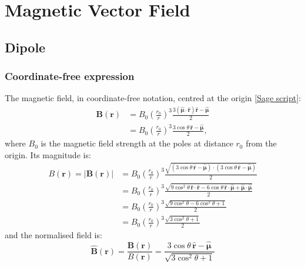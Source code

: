 \documentclass{book}
\newcommand{\unitvec}[1]{\hat{\pmb{#1}}}
\newcommand{\linktosage}[1]{\hyperref[#1]{[Sage script]}}
\begin{document}
\section{Magnetic Vector Field}

\subsection{Dipole}

\subsubsection{Coordinate-free expression}

The magnetic field, in coordinate-free notation, centred at the origin \linktosage{sage:Bdip}:
\begin{equation}
    \begin{aligned}
        \pmb{B}(\pmb{r})
            &= B_0\left(\frac{r_0}{r}\right)^3\frac{3(\unitvec{\mu}\cdot\unitvec{r})\unitvec{r} - \unitvec{\mu}}{2} \\
            &= B_0\left(\frac{r_0}{r}\right)^3\frac{3\cos\theta\,\unitvec{r} - \unitvec{\mu}}{2},
    \end{aligned}
\end{equation}
where $B_0$ is the magnetic field strength at the poles at distance $r_0$ from the origin.
Its magnitude is:
\begin{equation}
\begin{aligned}
    B({\pmb{r}}) = |\pmb{B}(\pmb{r})|
        &= B_0\left(\frac{r_0}{r}\right)^3 \frac{\sqrt{(3\cos\theta\,\unitvec{r} - \unitvec{\mu}) \cdot (3\cos\theta\,\unitvec{r} - \unitvec{\mu}) }}{2} \\
        &= B_0\left(\frac{r_0}{r}\right)^3 \frac{\sqrt{ 9\cos^2\theta\,\unitvec{r}\cdot\unitvec{r} - 6\cos\theta\,\unitvec{r}\cdot\unitvec{\mu} + \unitvec{\mu}\cdot\unitvec{\mu} }}{2} \\
        &= B_0\left(\frac{r_0}{r}\right)^3 \frac{\sqrt{ 9\cos^2\theta - 6\cos^2\theta + 1 }}{2} \\
        &= B_0\left(\frac{r_0}{r}\right)^3 \frac{\sqrt{3\cos^2\theta + 1}}{2}
\end{aligned}
\end{equation}
and the normalised field is:
\begin{equation}
    \unitvec{B}(\pmb{r})
        = \frac{\pmb{B}(\pmb{r})}{B(\pmb{r})}
        = \frac{3\cos\theta \, \unitvec{r} - \unitvec{\mu}}{\sqrt{3\cos^2\theta + 1}}
\end{equation}
\end{document}
